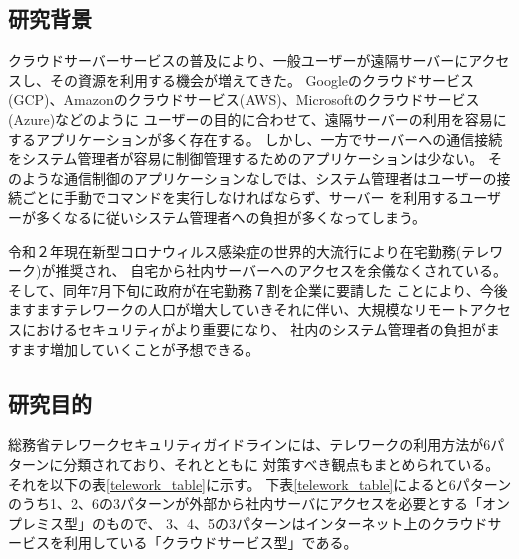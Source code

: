\documentclass[12pt,a4paper,titlepage]{jsarticle}
\begin{document}
\subsection{研究背景}
クラウドサーバーサービスの普及により、一般ユーザーが遠隔サーバーにアクセスし、その資源を利用する機会が増えてきた。
Googleのクラウドサービス(GCP)、Amazonのクラウドサービス(AWS)、Microsoftのクラウドサービス(Azure)などのように
ユーザーの目的に合わせて、遠隔サーバーの利用を容易にするアプリケーションが多く存在する。
しかし、一方でサーバーへの通信接続をシステム管理者が容易に制御管理するためのアプリケーションは少ない。
そのような通信制御のアプリケーションなしでは、システム管理者はユーザーの接続ごとに手動でコマンドを実行しなければならず、サーバー
を利用するユーザーが多くなるに従いシステム管理者への負担が多くなってしまう。\par
令和２年現在新型コロナウィルス感染症の世界的大流行により在宅勤務(テレワーク)が推奨され、
自宅から社内サーバーへのアクセスを余儀なくされている。そして、同年7月下旬に政府が在宅勤務７割を企業に要請した\cite{covid_nikkei}
ことにより、今後ますますテレワークの人口が増大していきそれに伴い、大規模なリモートアクセスにおけるセキュリティがより重要になり、
社内のシステム管理者の負担がますます増加していくことが予想できる。\par 









\subsection{研究目的}


総務省テレワークセキュリティガイドラインには、テレワークの利用方法が6パターンに分類されており、それとともに
対策すべき観点もまとめられている。\cite{telework_guideline}それを以下の表\ref{telework_table}に示す。
下表\ref{telework_table}によると6パターンのうち1、2、6の3パターンが外部から社内サーバにアクセスを必要とする「オンプレミス型」のもので、
3、4、5の3パターンはインターネット上のクラウドサービスを利用している「クラウドサービス型」である。
\end{document}
